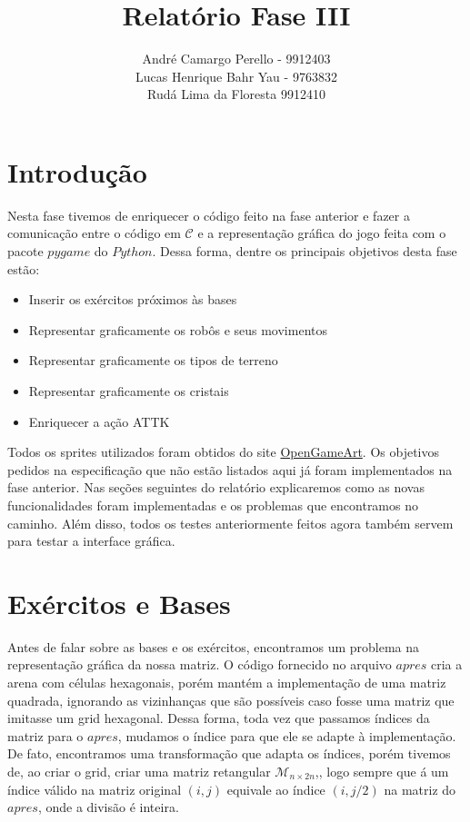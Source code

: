 \documentclass{article}
\begin{document}
\title{Relatório Fase III}
\author{André Camargo Perello - 9912403\\Lucas Henrique Bahr Yau - 9763832\\Rudá Lima da Floresta  9912410}
\date{}

\maketitle
\newpage
    \section{Introdução}
    Nesta fase tivemos de enriquecer o código feito na fase anterior e fazer a comunicação entre o código em $\mathcal{C}$ e a representação gráfica do jogo feita com o pacote $pygame$ do $Python$. Dessa forma, dentre os principais objetivos desta fase estão:
    \begin{itemize}
        \item Inserir os exércitos próximos às bases
        \item Representar graficamente os robôs e seus movimentos
        \item Representar graficamente os tipos de terreno
        \item Representar graficamente os cristais
        \item Enriquecer a ação ATTK
    \end{itemize}

    Todos os sprites utilizados foram obtidos do site \href{opengameart.org}{OpenGameArt}. Os objetivos pedidos na especificação que não estão listados aqui já foram implementados na fase anterior. Nas seções seguintes do relatório explicaremos como as novas funcionalidades foram implementadas e os problemas que encontramos no caminho. Além disso, todos os testes anteriormente feitos agora também servem para testar a interface gráfica.
    
    
    \section{Exércitos e Bases}
    Antes de falar sobre as bases e os exércitos, encontramos um problema na representação gráfica da nossa matriz. O código fornecido no arquivo $apres$ cria a arena com células hexagonais, porém mantém a implementação de uma matriz quadrada, ignorando as vizinhanças que são possíveis caso fosse uma matriz que imitasse um grid hexagonal. Dessa forma, toda vez que passamos índices da matriz para o $apres$, mudamos o índice para que ele se adapte à implementação. De fato, encontramos uma transformação que adapta os índices, porém tivemos de, ao criar o grid, criar uma matriz retangular $\mathcal{M}_{n\times2n}$,, logo sempre que á um índice válido na matriz original $(i, j)$ equivale ao índice $(i, j/2)$ na matriz do $apres$, onde a divisão é inteira.
    
\end{document}
